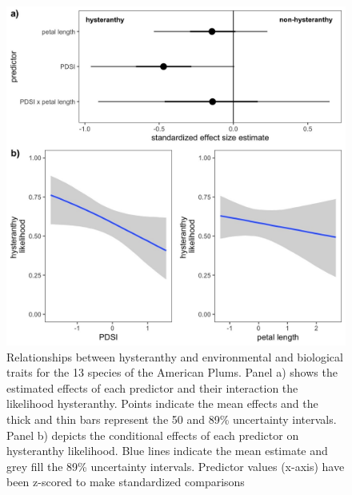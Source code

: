 \documentclass{article}[12pt]
\begin{document}
{\begin{figure}[h!]
    \label{fig:ordinals}
\end{figure}




\begin{figure}[h!]
    \centering
 \includegraphics[width=\textwidth]{..//..//Plots/whatReviwerswant/hypoth_preds.jpeg}
    \caption{Relationships between hysteranthy and environmental and biological traits for the 13 species of the American Plums. Panel a) shows the estimated effects of each predictor and their interaction the likelihood hysteranthy. Points indicate the mean effects and the thick and thin bars represent the 50 and 89\% uncertainty intervals. Panel b) depicts the conditional effects of each predictor on hysteranthy likelihood. Blue lines indicate the mean estimate and grey fill the 89\% uncertainty intervals.  Predictor values (x-axis) have been z-scored to make standardized comparisons}
    \label{fig:prunes}
\end{figure}


}
\end{document}
